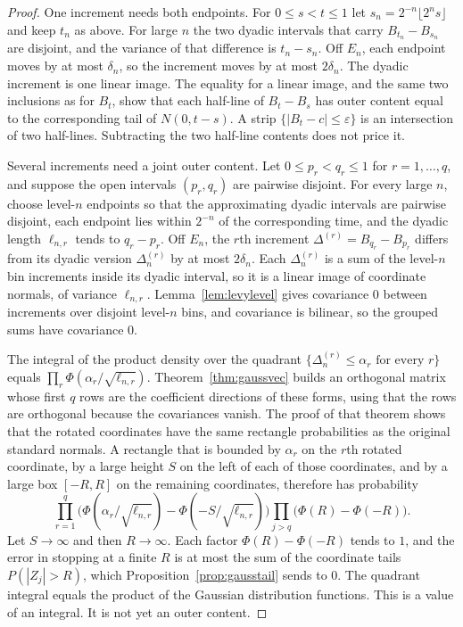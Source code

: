 \begin{proof}
One increment needs both endpoints. For $0\le s<t\le 1$ let $s_n=2^{-n}\lfloor 2^ns\rfloor$ and keep $t_n$ as above. For large $n$ the two dyadic intervals that carry $B_{t_n}-B_{s_n}$ are disjoint, and the variance of that difference is $t_n-s_n$. Off $E_n$, each endpoint moves by at most $\delta_n$, so the increment moves by at most $2\delta_n$. The dyadic increment is one linear image. The equality for a linear image, and the same two inclusions as for $B_t$, show that each half-line of $B_t-B_s$ has outer content equal to the corresponding tail of $N(0,t-s)$. A strip $\{|B_t-c|\le\varepsilon\}$ is an intersection of two half-lines. Subtracting the two half-line contents does not price it.

Several increments need a joint outer content. Let $0\le p_r<q_r\le 1$ for $r=1,\ldots,q$, and suppose the open intervals $(p_r,q_r)$ are pairwise disjoint. For every large $n$, choose level-$n$ endpoints so that the approximating dyadic intervals are pairwise disjoint, each endpoint lies within $2^{-n}$ of the corresponding time, and the dyadic length $\ell_{n,r}$ tends to $q_r-p_r$. Off $E_n$, the $r$th increment $\Delta^{(r)}=B_{q_r}-B_{p_r}$ differs from its dyadic version $\Delta_n^{(r)}$ by at most $2\delta_n$. Each $\Delta_n^{(r)}$ is a sum of the level-$n$ bin increments inside its dyadic interval, so it is a linear image of coordinate normals, of variance $\ell_{n,r}$. Lemma~\ref{lem:levylevel} gives covariance $0$ between increments over disjoint level-$n$ bins, and covariance is bilinear, so the grouped sums have covariance $0$.

The integral of the product density over the quadrant $\{\Delta_n^{(r)}\le\alpha_r\text{ for every }r\}$ equals $\prod_r\Phi(\alpha_r/\sqrt{\ell_{n,r}})$. Theorem~\ref{thm:gaussvec} builds an orthogonal matrix whose first $q$ rows are the coefficient directions of these forms, using that the rows are orthogonal because the covariances vanish. The proof of that theorem shows that the rotated coordinates have the same rectangle probabilities as the original standard normals. A rectangle that is bounded by $\alpha_r$ on the $r$th rotated coordinate, by a large height $S$ on the left of each of those coordinates, and by a large box $[-R,R]$ on the remaining coordinates, therefore has probability
\[
 \prod_{r=1}^q\bigl(\Phi(\alpha_r/\sqrt{\ell_{n,r}})-\Phi(-S/\sqrt{\ell_{n,r}})\bigr)
 \prod_{j>q}\bigl(\Phi(R)-\Phi(-R)\bigr).
\]
Let $S\to\infty$ and then $R\to\infty$. Each factor $\Phi(R)-\Phi(-R)$ tends to $1$, and the error in stopping at a finite $R$ is at most the sum of the coordinate tails $P(|Z_j|>R)$, which Proposition~\ref{prop:gausstail} sends to $0$. The quadrant integral equals the product of the Gaussian distribution functions. This is a value of an integral. It is not yet an outer content.


\end{proof}
